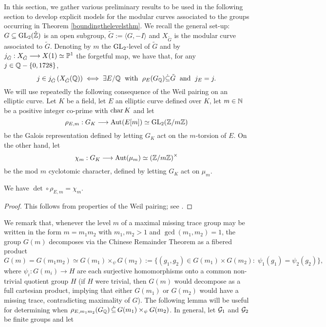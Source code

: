 In this section, we gather various preliminary results to be used in the following section to develop explicit models for the modular curves associated to the groups occurring in Theorem \ref{boundingthelevelsthm}.  We recall the general set-up:  $G \subseteq \operatorname{GL}_2(\hat{\mathbb{Z}})$ is an open subgroup, $\tilde{G} := \langle G, -I \rangle$ and $X_{\tilde{G}}$ is the modular curve associated to $\tilde{G}$.  Denoting by $m$ the $\operatorname{GL}_2$-level of $\tilde{G}$ and by $j_{\tilde{G}} : X_{\tilde{G}} \longrightarrow X(1) \simeq \mathbb{P}^1$ the forgetful map, we have that, for any $j \in \mathbb{Q} - \{ 0, 1728 \}$, 
\begin{equation} \label{interpofrationalpointsonXsubG}
j \in j_{\tilde{G}}\left( X_{\tilde{G}}(\mathbb{Q}) \right) \; \Longleftrightarrow \; \exists E / \mathbb{Q} \; \text{ with } \;\rho_E(G_{\mathbb{Q}}) \dot\subseteq \tilde{G} \; \text{ and } \; j_E = j.
\end{equation}
We will use repeatedly the following consequence of the Weil pairing on an elliptic curve.  Let $K$ be a field, let $E$ an elliptic curve defined over $K$, let $m \in \mathbb{N}$ be a positive integer co-prime with $\operatorname{char} K$ and let
\[
\rho_{E,m} : G_K \longrightarrow \operatorname{Aut}(E[m]) \simeq  \operatorname{GL}_2(\mathbb{Z}/m\mathbb{Z})
\]
be the Galois representation defined by letting $G_K$ act on the $m$-torsion of $E$.  On the other hand, let
\[
\chi_m : G_K \longrightarrow \operatorname{Aut}(\mu_m) \simeq \left( \mathbb{Z}/m\mathbb{Z} \right)^\times
\]
be the mod $m$ cyclotomic character, defined by letting $G_K$ act on $\mu_m$.
\begin{lemma} \label{weilpairinglemma}
We have $\det \circ \rho_{E,m} = \chi_m$.
\end{lemma}
\begin{proof}
This follows from properties of the Weil pairing; see \cite[Ch III, \S 8]{silverman}.
\end{proof}
We remark that, whenever the level $m$ of a maximal missing trace group may be written in the form $m = m_1 m_2$ with $m_1, m_2 > 1$ and $\gcd(m_1,m_2) = 1$, the group $G(m)$ decomposes via the Chinese Remainder Theorem as a fibered product
\[
G(m) = G(m_1m_2) \simeq G(m_1) \times_{\psi} G(m_2) := \{ (g_1, g_2) \in G(m_1) \times G(m_2) : \; \psi_1(g_1) = \psi_2(g_2) \},
\]
where $\psi_i : G(m_i) \longrightarrow H$ are each surjective homomorphisms onto a common non-trivial quotient group $H$ (if $H$ were trivial, then $G(m)$ would decompose as a full cartesian product, implying that either $G(m_1)$ or $G(m_2)$ would have a missing trace, contradicting maximality of $G$).  The following lemma will be useful for determining when $\rho_{E,m_1m_2}(G_{\mathbb{Q}}) \, \dot\subseteq \, G(m_1) \times_\psi G(m_2)$.  In general, let $\mathcal{G}_1$ and $\mathcal{G}_2$ be finite groups and let 
